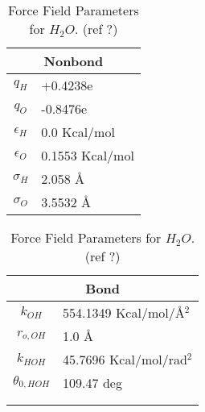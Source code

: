 \documentclass[twoside,english]{uiofysmaster}
\begin{document}
\begin{table}
 \caption{Force Field Parameters for $H_2O$. (ref ?) }
  \begin{tabular}[]{|c|l|}
  \hline
  \multicolumn{2}{|c|}{Nonbond} \\ \hline
  $q_H$ & +0.4238e  \\ \hline
  $q_O$ & -0.8476e  \\ \hline
  $\epsilon _H$ & 0.0 Kcal/mol \\ \hline
  $\epsilon _O$ & 0.1553 Kcal/mol \\ \hline
  $\sigma _H$ & 2.058 \AA{} \\ \hline
  $\sigma _O$ & 3.5532 \AA{} \\ \hline
 \end{tabular}
  \begin{tabular}[]{|c|l|}
  \hline
  \multicolumn{2}{|c|}{Bond} \\ \hline
  $k_{OH}$ & 554.1349 Kcal/mol/\AA{}$^2$  \\ \hline
  $r_{o,OH}$ & 1.0 \AA{}  \\ \hline
  $k_{HOH}$ & 45.7696 Kcal/mol/rad$^2$ \\ \hline
  $\theta _{0,HOH}$ & 109.47 deg \\ \hline
                    &           \\ \hline
                    &           \\ \hline

 \end{tabular}
 \label{ForceFieldParameters_H2O}
\end{table}
\end{document}
